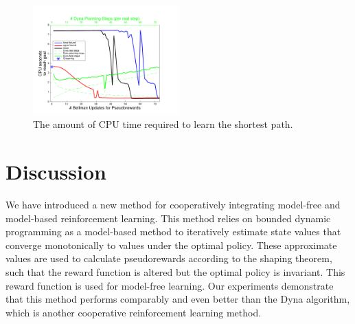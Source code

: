 \documentclass[letterpaper]{article}
\begin{document}
\begin{figure}[ht]
\centering
\includegraphics[width=0.5\textwidth]{MC_cpus_vs_PRiterations_DYNA_toGoal}
\caption{The amount of CPU time required to learn the shortest path.}
\label{fig:mc2}
\end{figure}

\section{Discussion}

We have introduced a new method for cooperatively integrating model-free and model-based reinforcement learning. This method relies on bounded dynamic programming as a model-based method to iteratively estimate state values that converge monotonically to values under the optimal policy. These approximate values are used to calculate pseudorewards according to the shaping theorem, such that the reward function is altered but the optimal policy is invariant. This reward function is used for model-free learning. Our experiments demonstrate that this method performs comparably and even better than the Dyna algorithm, which is another cooperative reinforcement learning method.
\end{document}
